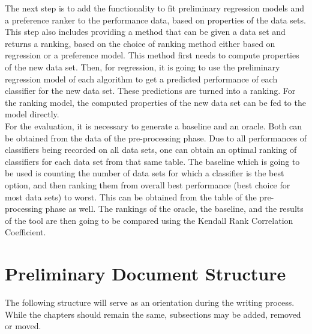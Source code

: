 \documentclass[12pt]{scrartcl}
\begin{document}

The next step is to add the functionality to fit preliminary regression models and a preference ranker to the performance data, based on properties of the data sets. This step also includes providing a method that can be given a data set and returns a ranking, based on the choice of ranking method either based on regression or a preference model. This method first needs to compute properties of the new data set. Then, for regression, it is going to use the preliminary regression model of each algorithm to get a predicted performance of each classifier for the new data set. These predictions are turned into a ranking. For the ranking model, the computed properties of the new data set can be fed to the model directly.\\

For the evaluation, it is necessary to generate a baseline and an oracle. Both can be obtained from the data of the pre-processing phase. Due to all performances of classifiers being recorded on all data sets, one can obtain an optimal ranking of classifiers for each data set from that same table. The baseline which is going to be used is counting the number of data sets for which a classifier is the best option, and then ranking them from overall best performance (best choice for most data sets) to worst. This can be obtained from the table of the pre-processing phase as well. The rankings of the oracle, the baseline, and the results of the tool are then going to be compared using the Kendall Rank Correlation Coefficient.

\newpage
\section{Preliminary Document Structure}\label{sec:doc-structure}
The following structure will serve as an orientation during the writing process. While the chapters should remain the same, subsections may be added, removed or moved.
\end{document}
